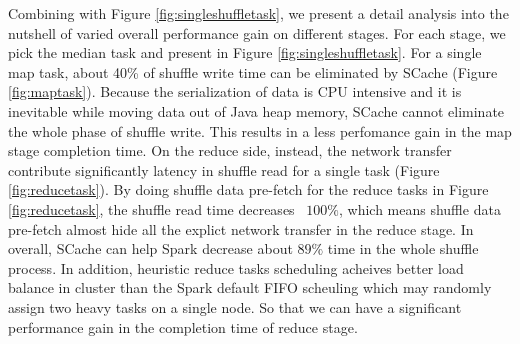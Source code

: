 Combining with Figure \ref{fig:singleshuffletask}, we present a detail analysis into the nutshell of varied overall performance gain on different stages. For each stage, we pick the median task and present in Figure \ref{fig:singleshuffletask}. For a single map task, about 40\% of shuffle write time can be eliminated by SCache (Figure \ref{fig:maptask}). Because the serialization of data is CPU intensive\cite{makingsense} and it is inevitable while moving data out of Java heap memory, SCache cannot eliminate the whole phase of shuffle write. This results in a less perfomance gain in the map stage completion time.
On the reduce side, instead, the network transfer contribute significantly latency in shuffle read for a single task (Figure \ref{fig:reducetask}). By doing shuffle data pre-fetch for the reduce tasks in Figure \ref{fig:reducetask}, the shuffle read time decreases ~$100\%$, which means shuffle data pre-fetch almost hide all the explict network transfer in the reduce stage. In overall, SCache can help Spark decrease about $89\%$ time in the whole shuffle process. In addition, heuristic reduce tasks scheduling acheives better load balance in cluster than the Spark default FIFO scheuling which may randomly assign two heavy tasks on a single node. So that we can have a significant performance gain in the completion time of reduce stage. 

 
		
